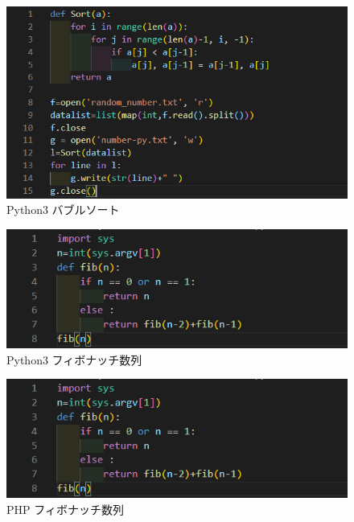 \begin{figure}[tb]
    \centering
    \includegraphics[width=13.5cm,keepaspectratio]{figure/b-rb.PNG}
    \caption{Python3 バブルソート}
    \label{fig:b-rb}
\end{figure}

\begin{figure}[tb]
    \centering
    \includegraphics[width=13.5cm,keepaspectratio]{figure/f-py.PNG}
    \caption{Python3 フィボナッチ数列}
    \label{fig:f-py}
\end{figure}

\begin{figure}[tb]
    \centering
    \includegraphics[width=13.5cm,keepaspectratio]{figure/f-py.PNG}
    \caption{PHP フィボナッチ数列}
    \label{fig:f-php}
\end{figure}

